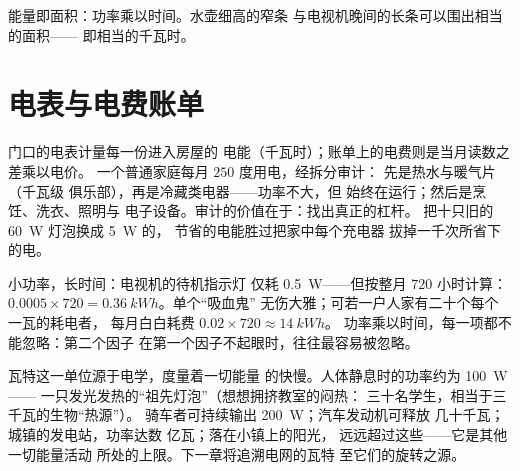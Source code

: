 \begin{omfigure}

{\small 能量即面积：功率乘以时间。水壶细高的窄条
与电视机晚间的长条可以围出相当的面积——
即相当的千瓦时。}
\end{omfigure}

\section{电表与电费账单}

\begin{example}[读懂账单]\label{ex:g9:electric-power-energy:bill}
门口的电表计量每一份进入房屋的
电能（千瓦时）；账单上的电费则是当月读数之差乘以电价。
一个普通家庭每月 $250$ 度用电，经拆分审计：
先是热水与暖气片（千瓦级
俱乐部），再是冷藏类电器——功率不大，但
始终在运行；然后是烹饪、洗衣、照明与
电子设备。审计的价值在于：找出真正的杠杆。
把十只旧的 \qty{60}{W} 灯泡换成 \qty{5}{W} 的，
节省的电能胜过把家中每个充电器
拔掉一千次所省下的电。
\end{example}

\begin{example}[待机“吸血鬼”]\label{ex:g9:electric-power-energy:standby}
小功率，长时间：电视机的待机指示灯
仅耗 \qty{0.5}{W}——但按整月 $720$ 小时计算：
$0.0005 \times 720 = \qty{0.36}{kWh}$。单个“吸血鬼”
无伤大雅；可若一户人家有二十个每个一瓦的耗电者，
每月白白耗费 $0.02 \times 720 \approx \qty{14}{kWh}$。
功率乘以时间，每一项都不能忽略：第二个因子
在第一个因子不起眼时，往往最容易被忽略。
\end{example}

\begin{remark}[功率在更广阔的世界中]\label{rem:g9:electric-power-energy:wider}
瓦特这一单位源于电学，度量着一切能量
的快慢。人体静息时的功率约为 \qty{100}{W}——
一只发光发热的“祖先灯泡”（想想拥挤教室的闷热：
三十名学生，相当于三千瓦的生物“热源”）。
骑车者可持续输出 \qty{200}{W}；汽车发动机可释放
几十千瓦；城镇的发电站，功率达数
亿瓦；落在小镇上的阳光，
远远超过这些——它是其他一切能量活动
所处的上限。下一章将追溯电网的瓦特
至它们的旋转之源。
\end{remark}

